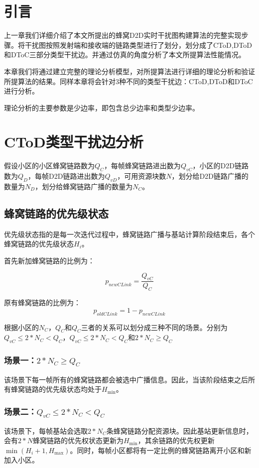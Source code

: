 \documentclass[figurelist,tablelist,algorithmlist,nomlist,masters]{seuthesix}
\begin{document}
	\section{引言}
	上一章我们详细介绍了本文所提出的蜂窝D2D实时干扰图构建算法的完整实现步骤。将干扰图按照发射端和接收端的链路类型进行了划分，划分成了CToD,DToD和DToC三部分类型干扰边。并通过仿真的角度分析了本文所提算法性能情况。
	
	本章我们将通过建立完整的理论分析模型，对所提算法进行详细的理论分析和验证所提算法的结果。同样本章将会针对3种不同的类型干扰边：CToD,DToD和DToC进行分析。
	
	理论分析的主要参数是少边率，即包含总少边率和类型少边率。
	
	\section{CToD类型干扰边分析}
	假设小区的小区蜂窝链路数为$Q_C$，每帧蜂窝链路进出数为$Q_{vC}$，小区的D2D链路数为$Q_D$，每帧D2D链路进出数为$Q_{vD}$，可用资源块数$N$，划分给D2D链路广播的数量为$N_D$，划分给蜂窝链路广播的数量为$N_C$。
	
	\subsection{蜂窝链路的优先级状态}
	优先级状态指的是每一次迭代过程中，蜂窝链路广播与基站计算阶段结束后，各个蜂窝链路的优先级状态${H_i}$。
	
	首先新加蜂窝链路的比例为：
	
	\begin{equation}\label{eq3.1}
	{p_{newCLink}} = \frac{{Q_{vC}}}{{Q_C}}
	\end{equation}
	
	原有蜂窝链路的比例为：
	\begin{equation}\label{eq3.1}
	{p_{oldCLink}} = 1 - {p_{newCLink}}
	\end{equation}
	
	根据小区的$N_C$，$Q_C$和$Q_C$三者的关系可以划分成三种不同的场景。分别为$Q_{vC} \le 2*N_C < Q_C$，$Q_{vC} \le 2*N_C < Q_C$和$2*N_C \ge Q_C$
	
	\subsubsection{场景一：$2*N_C \ge Q_C$}
	该场景下每一帧所有的蜂窝链路都会被选中广播信息。因此，当该阶段结束之后所有蜂窝链路的优先级状态均处于${H_{\min }}$。
	
	\subsubsection{场景二：$Q_{vC} \le 2*N_C < Q_C$}
	该场景下，每帧基站会选取$2*N_C$条蜂窝链路分配资源块。因此基站更新信息时，会有$2*N$蜂窝链路的优先权状态更新为${H_{\min }}$，其余链路的优先权更新$\min ({H_i} + 1,{H_{\max }})$。同时，每帧小区都将有一定比例的蜂窝链路离开小区和新加入小区。
	
\end{document}
